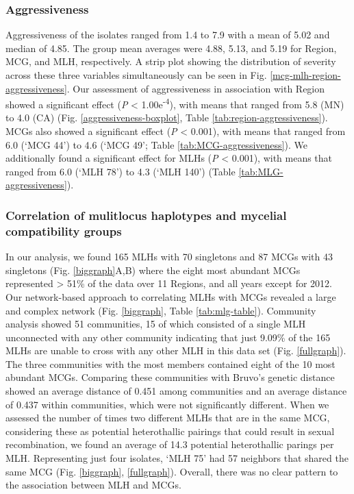 \documentclass[fleqn,10pt,lineno]{wlpeerj} %
\theoremstyle{definition}
\theoremstyle{definition}
\theoremstyle{definition}
\theoremstyle{remark}
\begin{document}
\subsubsection*{Aggressiveness}\label{aggressiveness-1}

Aggressiveness of the isolates ranged from 1.4 to 7.9 with a mean of
5.02 and median of 4.85. The group mean averages were 4.88, 5.13, and
5.19 for Region, MCG, and MLH, respectively. A strip plot showing the
distribution of severity across these three variables simultaneously can
be seen in Fig. \ref{mcg-mlh-region-aggressiveness}. Our assessment of
aggressiveness in association with Region showed a significant effect
(\emph{P} \textless{} 1.00e\textsuperscript{-4}), with means that ranged
from 5.8 (MN) to 4.0 (CA) (Fig. \ref{aggressiveness-boxplot}, Table
\ref{tab:region-aggressiveness}). MCGs also showed a significant effect
(\emph{P} \textless{} 0.001), with means that ranged from 6.0 (`MCG 44')
to 4.6 (`MCG 49'; Table \ref{tab:MCG-aggressiveness}). We additionally
found a significant effect for MLHs (\emph{P} \textless{} 0.001), with
means that ranged from 6.0 (`MLH 78') to 4.3 (`MLH 140') (Table
\ref{tab:MLG-aggressiveness}).

\subsubsection*{Correlation of mulitlocus haplotypes and mycelial
compatibility
groups}\label{correlation-of-mulitlocus-haplotypes-and-mycelial-compatibility-groups}

In our analysis, we found 165 MLHs with 70 singletons and 87 MCGs with
43 singletons (Fig. \ref{biggraph}A,B) where the eight most abundant
MCGs represented \textgreater{} 51\% of the data over 11 Regions, and
all years except for 2012. Our network-based approach to correlating
MLHs with MCGs revealed a large and complex network (Fig.
\ref{biggraph}, Table \ref{tab:mlg-table}). Community analysis showed 51
communities, 15 of which consisted of a single MLH unconnected with any
other community indicating that just 9.09\% of the 165 MLHs are unable
to cross with any other MLH in this data set (Fig. \ref{fullgraph}). The
three communities with the most members contained eight of the 10 most
abundant MCGs. Comparing these communities with Bruvo's genetic distance
showed an average distance of 0.451 among communities and an average
distance of 0.437 within communities, which were not significantly
different. When we assessed the number of times two different MLHs that
are in the same MCG, considering these as potential heterothallic
pairings that could result in sexual recombination, we found an average
of 14.3 potential heterothallic parings per MLH. Representing just four
isolates, `MLH 75' had 57 neighbors that shared the same MCG (Fig.
\ref{biggraph}, \ref{fullgraph}). Overall, there was no clear pattern to
the association between MLH and MCGs.
\end{document}

